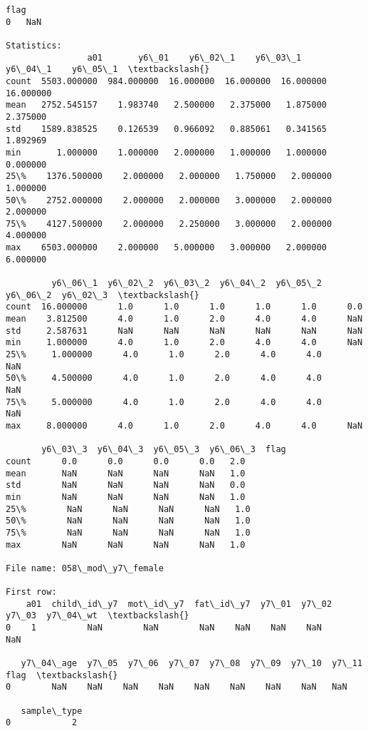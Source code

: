 \documentclass[11pt]{article}
\begin{document}
\begin{Verbatim}[commandchars=\\\{\}]
   flag  
0   NaN  

Statistics: 
                a01       y6\_01    y6\_02\_1    y6\_03\_1    y6\_04\_1    y6\_05\_1  \textbackslash{}
count  5503.000000  984.000000  16.000000  16.000000  16.000000  16.000000   
mean   2752.545157    1.983740   2.500000   2.375000   1.875000   2.375000   
std    1589.838525    0.126539   0.966092   0.885061   0.341565   1.892969   
min       1.000000    1.000000   2.000000   1.000000   1.000000   0.000000   
25\%    1376.500000    2.000000   2.000000   1.750000   2.000000   1.000000   
50\%    2752.000000    2.000000   2.000000   3.000000   2.000000   2.000000   
75\%    4127.500000    2.000000   2.250000   3.000000   2.000000   4.000000   
max    6503.000000    2.000000   5.000000   3.000000   2.000000   6.000000   

         y6\_06\_1  y6\_02\_2  y6\_03\_2  y6\_04\_2  y6\_05\_2  y6\_06\_2  y6\_02\_3  \textbackslash{}
count  16.000000      1.0      1.0      1.0      1.0      1.0      0.0   
mean    3.812500      4.0      1.0      2.0      4.0      4.0      NaN   
std     2.587631      NaN      NaN      NaN      NaN      NaN      NaN   
min     1.000000      4.0      1.0      2.0      4.0      4.0      NaN   
25\%     1.000000      4.0      1.0      2.0      4.0      4.0      NaN   
50\%     4.500000      4.0      1.0      2.0      4.0      4.0      NaN   
75\%     5.000000      4.0      1.0      2.0      4.0      4.0      NaN   
max     8.000000      4.0      1.0      2.0      4.0      4.0      NaN   

       y6\_03\_3  y6\_04\_3  y6\_05\_3  y6\_06\_3  flag  
count      0.0      0.0      0.0      0.0   2.0  
mean       NaN      NaN      NaN      NaN   1.0  
std        NaN      NaN      NaN      NaN   0.0  
min        NaN      NaN      NaN      NaN   1.0  
25\%        NaN      NaN      NaN      NaN   1.0  
50\%        NaN      NaN      NaN      NaN   1.0  
75\%        NaN      NaN      NaN      NaN   1.0  
max        NaN      NaN      NaN      NaN   1.0  

File name: 058\_mod\_y7\_female

First row: 
    a01  child\_id\_y7  mot\_id\_y7  fat\_id\_y7  y7\_01  y7\_02  y7\_03  y7\_04\_wt  \textbackslash{}
0    1          NaN        NaN        NaN    NaN    NaN    NaN       NaN   

   y7\_04\_age  y7\_05  y7\_06  y7\_07  y7\_08  y7\_09  y7\_10  y7\_11  flag  \textbackslash{}
0        NaN    NaN    NaN    NaN    NaN    NaN    NaN    NaN   NaN   

   sample\_type  
0            2  


\end{Verbatim}
\end{document}
